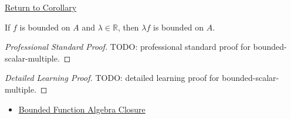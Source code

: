 \newpage
{}
\label{prf:bounded-scalar-multiple}

\begin{remark*}[Return]
\hyperref[cor:bounded-scalar-multiple]{Return to Corollary}
\end{remark*}

\begin{corollary*}
If \(f\) is bounded on \(A\) and \(\lambda\in\mathbb{R}\), then
\(\lambda f\) is bounded on \(A\).
\end{corollary*}

\begin{proof}[Professional Standard Proof]
\LRAProofBodyStart
TODO: professional standard proof for bounded-scalar-multiple.
\end{proof}

\begin{proof}[Detailed Learning Proof]
\LRAProofBodyStart
TODO: detailed learning proof for bounded-scalar-multiple.
\end{proof}

\begin{remark*}
\end{remark*}

\begin{dependencies}
\begin{itemize}
  \item \hyperref[thm:bounded-function-algebra-closure]{Bounded Function Algebra Closure}
\end{itemize}
\end{dependencies}

\clearpage
